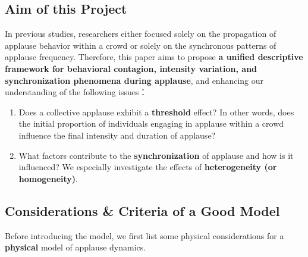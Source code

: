 \documentclass[UTF8,a4paper,11pt]{ctexart}
\begin{document}
\subsection{Aim of this Project}
In previous studies, researchers either focused solely on the propagation of applause behavior within a crowd or solely on the synchronous patterns of applause frequency. Therefore, this paper aims to propose \textbf{a unified descriptive framework for behavioral contagion, intensity variation, and synchronization phenomena during applause}, and enhancing our understanding of the following issues：

\begin{enumerate}
    \item Does a collective applause exhibit a \textbf{threshold} effect? In other words, does the initial proportion of individuals engaging in applause within a crowd influence the final intensity and duration of applause?

    \item What factors contribute to the \textbf{synchronization} of applause and how is it influenced? We especially investigate the effects of \textbf{heterogeneity (or homogeneity)}.
\end{enumerate}

\subsection{Considerations \& Criteria of a Good Model}

Before introducing the model, we first list some physical considerations for a \textbf{physical} model of applause dynamics. 
\end{document}
